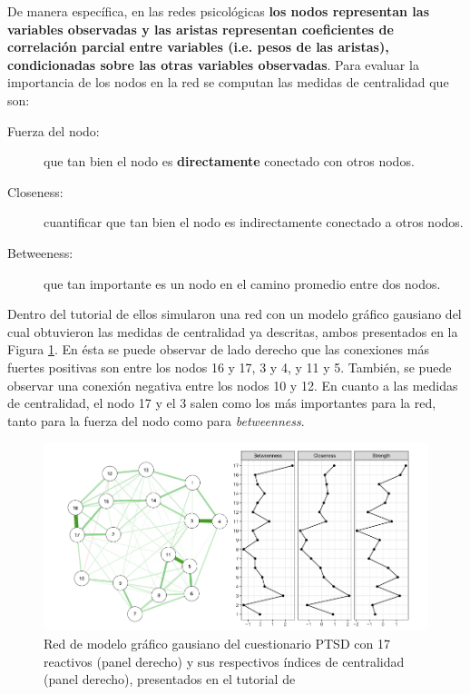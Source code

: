 \documentclass[11pt,spanish]{article}\usepackage[]{graphicx}\usepackage[]{color}
\begin{document}
De manera específica, en las redes psicológicas {\bf los nodos representan las variables observadas y las aristas representan coeficientes de correlación parcial entre variables (i.e. pesos de las aristas), condicionadas sobre las otras variables observadas}. Para evaluar la importancia de los nodos en la red se computan las medidas de centralidad que son: 

\begin{description}
  \item[Fuerza del nodo:] que tan bien el nodo es {\bf directamente} conectado con otros nodos.
  \item[Closeness:] cuantificar que tan bien el nodo es indirectamente conectado a otros nodos. 
  \item[Betweeness:] que tan importante es un nodo en el camino promedio entre dos nodos. 
\end{description}

Dentro del tutorial de \cite{main_tutorial} ellos simularon una red con un modelo gráfico gausiano del cual obtuvieron las medidas de centralidad ya descritas, ambos presentados en la Figura \ref{fig:tuto_red}. En ésta se puede observar de lado derecho que las conexiones más fuertes positivas son entre los nodos 16 y 17, 3 y 4, y 11 y 5. También, se puede observar una conexión negativa entre los nodos 10 y 12. En cuanto a las medidas de centralidad, el nodo 17 y el 3 salen como los más importantes para la red, tanto para la fuerza del nodo como para \emph{betweenness}. 

\begin{figure}[!ht]
\centering
\includegraphics[scale=0.5]{images/red_medidas_tutorial}
\caption{Red de modelo gráfico gausiano del cuestionario PTSD con 17 reactivos (panel derecho) y sus respectivos índices de centralidad (panel derecho), presentados en el tutorial de \cite{main_tutorial}}
\label{fig:tuto_red}
\end{figure}
\end{document}
